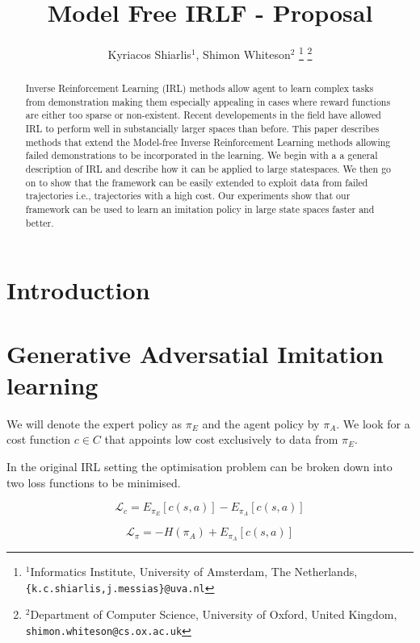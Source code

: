 \documentclass[letterpaper, 10 pt, conference]{ieeeconf}
\title{\LARGE \bf
Model Free IRLF - Proposal
}
\author{Kyriacos Shiarlis$^{1}$, Shimon Whiteson$^{2}$%
\thanks{$^{1}$Informatics Institute, University of Amsterdam, The Netherlands,
         {\tt\small \{k.c.shiarlis,j.messias\}@uva.nl}}%
\thanks{$^{2}$Department of Computer Science, University of Oxford, United Kingdom,
         {\tt\small shimon.whiteson@cs.ox.ac.uk}}%
}
\begin{document}
\maketitle

\thispagestyle{empty}
\pagestyle{empty}


\begin{abstract}
Inverse Reinforcement Learning (IRL) methods allow agent to learn complex tasks from demonstration making them especially appealing in cases where reward functions are either too sparse or non-existent. Recent developements in the field have allowed IRL to perform well in substancially larger spaces than before. This paper describes methods that extend the Model-free Inverse Reinforcement Learning methods allowing failed demonstrations to be incorporated in the learning. We begin with a a general description of IRL and describe how it can be applied to large statespaces. We then go on to show that the framework can be easily extended to exploit data from failed trajectories i.e., trajectories with a high cost. Our experiments show that our framework can be used to learn an imitation policy in large state spaces faster and better. 
\end{abstract}

\section{Introduction}
\section{Generative Adversatial Imitation learning}
We will denote the expert policy as $\pi_E$ and the agent policy by $\pi_A$. We look for a cost function $c \in C$ that appoints low cost exclusively to data from $\pi_E$. 

In the original IRL setting the optimisation problem can be broken down into two loss functions to be minimised.

\begin{equation}
\mathcal{L}_c = E_{\pi_E}[c(s,a)] - E_{\pi_A}[c(s,a)] \label{eq:LC}
\end{equation}


\begin{equation}
 \mathcal{L}_{\pi} = -H(\pi_A) + E_{\pi_A}[c(s,a)] \label{eq:LP}
\end{equation}
\end{document}
